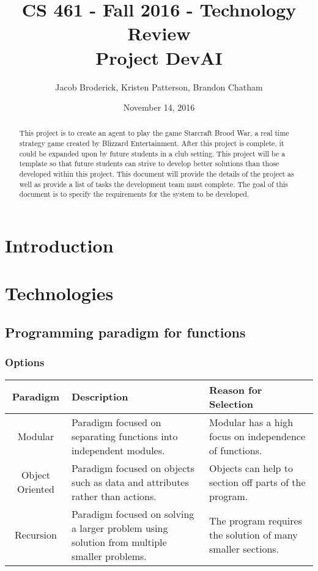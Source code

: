 \documentclass[10pt,letterpaper,onecolumn,draftclsnofoot]{IEEEtran}
\begin{document}
\begin{titlepage}

  \title{CS 461 - Fall 2016 - Technology Review \\ Project DevAI}
  \author{Jacob Broderick, Kristen Patterson, Brandon Chatham}
  \date{November 14, 2016}
  \maketitle
  \vspace{4cm}
  \begin{abstract}
  	\noindent 
  	  	\noindent
	This project is to create an agent to play the game Starcraft Brood War, a real time strategy game created by Blizzard Entertainment. After this project is complete, it could be expanded upon by future students in a club setting. This project will be a template so that future students can strive to develop better solutions than those developed within this project. This document will provide the details of the project as well as provide a list of tasks the development team must complete. The goal of this document is to specify the requirements for the system to be developed.
   \end{abstract}
\end{titlepage}

\tableofcontents

\newpage

\section{Introduction}

\section{Technologies}

\subsection{Programming paradigm for functions}
\subsubsection{Options}
\begin{center}
\begin{tabular}{ ||C|L|L|| } 
\hline
Paradigm & Description & Reason for Selection \\
 \hline
 Modular & Paradigm focused on separating functions into independent modules. & Modular has a high focus on independence of functions. \\ 
 \hline
 Object Oriented & Paradigm focused on objects such as data and attributes rather than actions. & Objects can help to section off parts of the program. \\ 
 \hline
 Recursion & Paradigm focused on solving a larger problem using solution from multiple smaller problems. & The program requires the solution of many smaller sections. \\ 
 \hline
\end{tabular}
\end{center}
\end{document}
